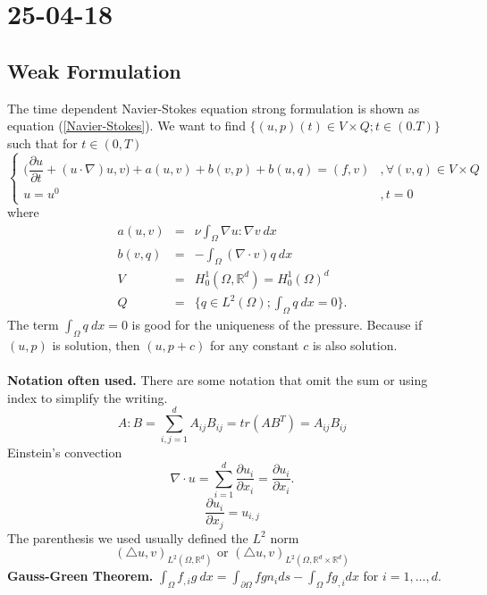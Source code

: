 \documentclass[a4paper,10pt]{article}
\newcommand{\R}{\mathbb{R}}
\begin{document}
\newpage
\section{25-04-18}

\subsection{Weak Formulation}
The time dependent Navier-Stokes equation strong formulation is shown as equation (\ref{Navier-Stokes}). We want to find $ \{ (u,p)(t) \in V \times Q ; t \in (0.T) \} $ such that for $ t \in (0,T) $
\begin{equation} \label{NS_Weak}
\begin{cases}
\big( \dfrac{\partial u}{\partial t} + (u \cdot \nabla)u,v \big) + a(u,v) + b(v,p) + b(u,q) = (f,v) & ,\forall(v,q)\in V\times Q \\ u=u^{0} & , t=0
\end{cases}
\end{equation}
where
\begin{eqnarray}\nonumber
a(u,v) &=& \nu \int_{\Omega} \nabla u : \nabla v \ dx \\ \nonumber
b(v,q) &=& - \int_{\Omega} (\nabla \cdot v) q \ dx \\ \nonumber
V &=& H_{0}^{1}(\Omega, \R^d) = H_{0}^{1}(\Omega)^d \\ \nonumber
Q &=& \{ q\in L^2(\Omega) ; \int_{\Omega} q \ dx=0 \}.
\end{eqnarray}
The term $ \int_{\Omega} q \ dx=0 $ is good for the uniqueness of the pressure. Because if $ (u,p) $ is solution, then $ (u,p+c) $ for any constant $ c $ is also solution. \\ \\
\textbf{Notation often used.} There are some notation that omit the sum or using index to simplify the writing.\\
\[ A : B = \sum_{i,j=1}^{d} A_{ij}B_{ij} = tr(AB^{T}) = A_{ij}B_{ij} \]
Einstein's convection
\[ \nabla \cdot u = \sum_{i=1}^{d} \dfrac{\partial u_{i}}{\partial x_{i}} = \dfrac{\partial u_{i}}{\partial x_{i}}. \]
\[ \dfrac{\partial u_{i}}{\partial x_{j}} = u_{i,j} \]
The parenthesis we used usually defined the $ L^2 $ norm
\[ (\bigtriangleup u, v)_{L^2(\Omega,\R^d)} \text{ or } (\bigtriangleup u, v)_{L^2(\Omega,\R^d \times \R^d)}  \]
\textbf{Gauss-Green Theorem.} $ \int_{\Omega} f_{,i} g \ dx = \int_{\partial \Omega} f g n_{i} ds - \int_{\Omega} f g_{,i} dx $ for $ i=1, \dots, d $.\\\\
\end{document}
